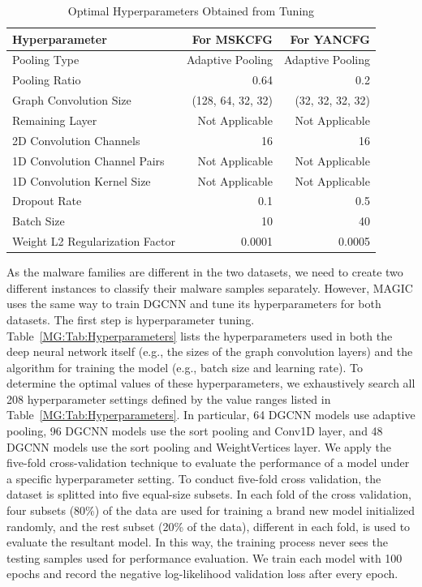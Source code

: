 \begin{table}
    \begin{center}
         \caption{Optimal Hyperparameters Obtained from Tuning}
         \begin{tabular}{lrr}
            \hline
            \hline
            Hyperparameter & For MSKCFG & For YANCFG \\
            \hline
            Pooling Type & Adaptive Pooling &  Adaptive Pooling\\
            Pooling Ratio & 0.64 & 0.2 \\
            Graph Convolution Size & (128, 64, 32, 32) & (32, 32, 32, 32)\\
            Remaining Layer & Not Applicable &  Not Applicable \\
            2D Convolution Channels & 16 & 16 \\
            1D Convolution Channel Pairs & Not Applicable & Not Applicable \\
            1D Convolution Kernel Size & Not Applicable & Not Applicable\\
            Dropout Rate & 0.1 & 0.5 \\
            Batch Size & 10 & 40\\
            Weight L2 Regularization Factor & 0.0001 & 0.0005\\
            \hline
        \end{tabular}
        \label{MG:Tab:BestHyperparameters}
    \end{center}
\end{table}

As the malware families are different in the two datasets, we need to create two different \sysname instances to classify their malware samples separately. However, MAGIC uses the same way to train DGCNN and tune its hyperparameters for both datasets.
The first step is hyperparameter tuning.
Table~\ref{MG:Tab:Hyperparameters} lists the hyperparameters used in both the deep neural network itself (e.g., the sizes of the graph convolution layers) and the algorithm for training the model (e.g., batch size and learning rate).
To determine the optimal values of these hyperparameters,
we exhaustively search all 208 hyperparameter settings defined by the value ranges listed in Table~\ref{MG:Tab:Hyperparameters}.
In particular, 64 DGCNN models use adaptive pooling, 96 DGCNN models use the sort pooling and Conv1D layer, and 48 DGCNN models use the sort pooling and WeightVertices layer.
We apply the five-fold cross-validation technique to evaluate the performance of a model under a specific hyperparameter setting.
To conduct five-fold cross validation, the dataset is splitted into five equal-size subsets.
In each fold of the cross validation, four subsets (80\%) of the data are used for training a brand new model initialized randomly,
and the rest subset (20\% of the data), different in each fold, is used to evaluate the resultant model.
In this way, the training process never sees the testing samples used for performance evaluation.
We train each model with 100 epochs and record the negative log-likelihood validation loss after every epoch.

